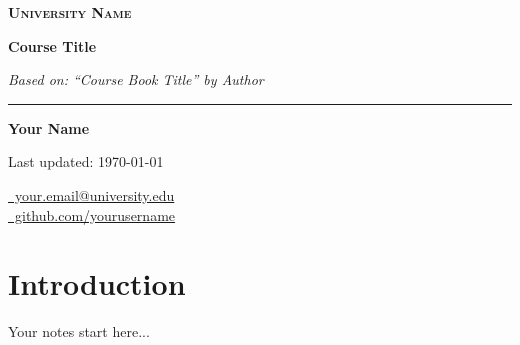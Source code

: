 \documentclass[12pt,a4paper]{article}
\begin{document}
\begin{titlepage}
    \centering
    \vspace*{1.5cm}

    {\scshape\Large \textbf{University Name} \par}
    \vspace{1.5cm}

    {\Huge\bfseries Course Title \par}
    \vspace{0.5cm}

    {\Large\itshape Based on: ``Course Book Title'' by Author \par}
    \vspace{2.5cm}

    
    \rule{0.65\textwidth}{0.35\textwidth} %
    \vspace{2.5cm}

    {\Large \textbf{Your Name} \par}
    \vspace{0.5cm}
    {\large Last updated: \today \par}
\vfill %

    \begin{flushright}
        \small %
        \href{mailto:your.email@university.edu}{\faEnvelope\ your.email@university.edu} \\
        \vspace{0.15cm} %
        \href{https://github.com/yourusername}{\faGithub\ github.com/yourusername}
    \end{flushright}
    
    \vspace*{-3em} %

\end{titlepage}

\newpage
\tableofcontents
\newpage

\section{Introduction}
Your notes start here...
\end{document}
